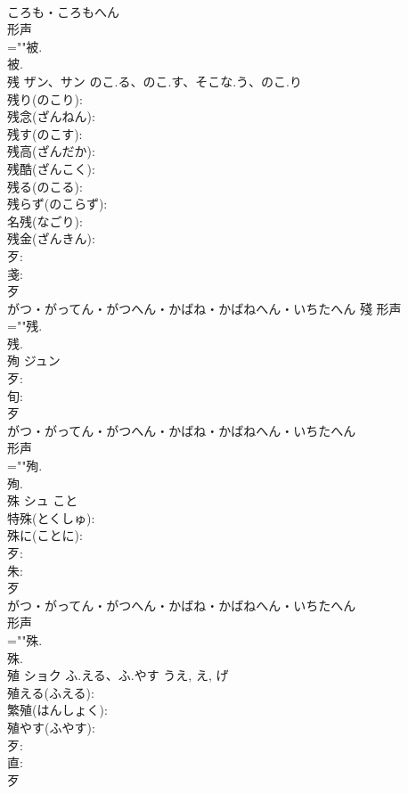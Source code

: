 \documentclass[8pt]{extreport}
\begin{document}
\begin{CJK}{UTF8}{min}
\\	ころも・ころもへん	
\\	形声 
\\	=""被.
\\	被.
\\	残	ザン、サン	のこ.る、のこ.す、そこな.う、のこ.り		
\\	残り(のこり): 
\\	残念(ざんねん): 
\\	残す(のこす): 
\\	残高(ざんだか): 
\\	残酷(ざんこく): 
\\	残る(のこる): 
\\	残らず(のこらず): 
\\	名残(なごり): 
\\	残金(ざんきん): 
\\	歹: 
\\	戔: 
\\	歹	
\\	がつ・がってん・がつへん・かばね・かばねへん・いちたへん	殘	形声 
\\	=""残.
\\	残.
\\	殉	ジュン			
\\	歹: 
\\	旬: 
\\	歹	
\\	がつ・がってん・がつへん・かばね・かばねへん・いちたへん	
\\	形声 
\\	=""殉.
\\	殉.
\\	殊	シュ	こと		
\\	特殊(とくしゅ): 
\\	殊に(ことに): 
\\	歹: 
\\	朱: 
\\	歹	
\\	がつ・がってん・がつへん・かばね・かばねへん・いちたへん	
\\	形声 
\\	=""殊.
\\	殊.
\\	殖	ショク	ふ.える、ふ.やす	うえ, え, げ	
\\	殖える(ふえる): 
\\	繁殖(はんしょく): 
\\	殖やす(ふやす): 
\\	歹: 
\\	直: 
\\	歹	

\end{CJK}
\end{document}
